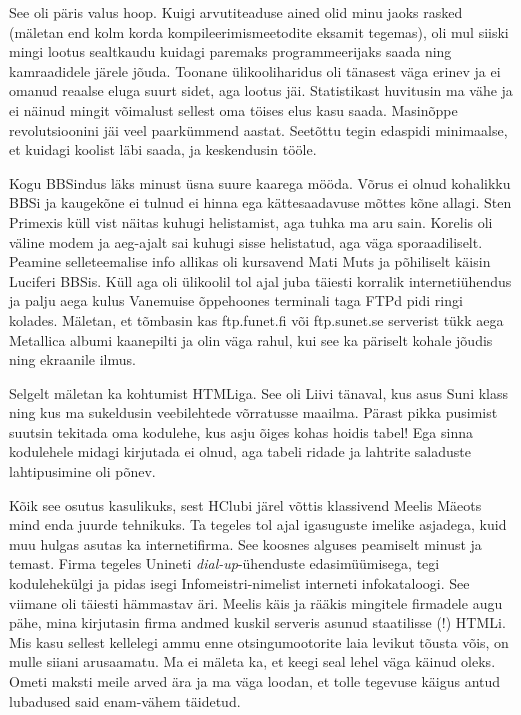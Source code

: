 See oli päris 
valus hoop. Kuigi arvutiteaduse ained olid minu jaoks rasked (mäletan end kolm 
korda kompileerimismeetodite eksamit tegemas), oli mul siiski mingi lootus 
sealtkaudu kuidagi paremaks programmeerijaks saada ning kamraadidele järele 
jõuda. Toonane ülikooliharidus oli tänasest väga erinev ja ei omanud reaalse eluga 
suurt sidet, aga lootus jäi. Statistikast huvitusin ma vähe ja 
ei näinud mingit võimalust sellest oma töises elus kasu saada. Masinõppe revolutsioonini 
jäi veel paarkümmend aastat. Seetõttu tegin 
edaspidi minimaalse, et kuidagi koolist läbi saada, ja keskendusin tööle. 

Kogu BBSindus läks minust üsna suure kaarega mööda. Võrus ei olnud kohalikku 
BBSi ja kaugekõne ei tulnud ei hinna ega kättesaadavuse mõttes kõne allagi. 
Sten Primexis küll vist näitas kuhugi 
helistamist, aga tuhka ma aru sain. Korelis oli väline modem ja aeg-ajalt 
sai kuhugi sisse helistatud, aga väga sporaadiliselt. Peamine 
selleteemalise info allikas oli kursavend Mati Muts ja 
põhiliselt käisin Luciferi BBSis. Küll aga oli 
ülikoolil tol ajal juba täiesti korralik internetiühendus ja palju aega kulus 
Vanemuise õppehoones terminali 
taga FTPd pidi ringi kolades. Mäletan, et tõmbasin kas ftp.funet.fi või 
ftp.sunet.se serverist tükk aega Metallica albumi kaanepilti ja olin väga 
rahul, kui see ka päriselt kohale jõudis ning ekraanile ilmus.

Selgelt mäletan ka kohtumist HTMLiga. See oli Liivi 
tänaval, kus asus Suni 
klass 
ning kus ma sukeldusin veebilehtede 
võrratusse maailma. Pärast pikka pusimist suutsin tekitada oma kodulehe, kus 
asju õiges kohas hoidis tabel! Ega sinna kodulehele midagi kirjutada ei olnud, 
aga tabeli ridade ja lahtrite saladuste lahtipusimine oli põnev.

Kõik see osutus kasulikuks, sest HClubi järel võttis 
klassivend Meelis Mäeots mind enda juurde tehnikuks. Ta tegeles tol ajal 
igasuguste imelike asjadega, kuid muu hulgas asutas ka internetifirma. See koosnes 
alguses peamiselt minust ja temast. Firma tegeles Unineti 
\emph{dial-up}-ühenduste edasimüümisega, tegi kodulehekülgi ja pidas isegi 
Infomeistri-nimelist interneti infokataloogi. See viimane oli täiesti hämmastav 
äri. Meelis käis ja rääkis mingitele firmadele augu pähe, mina kirjutasin firma 
andmed kuskil serveris asunud staatilisse (!) HTMLi. Mis kasu sellest kellelegi 
ammu enne otsingumootorite laia levikut tõusta võis, on mulle siiani 
arusaamatu. Ma ei mäleta ka, et keegi seal lehel väga käinud oleks. Ometi maksti 
meile arved ära ja ma väga loodan, et tolle tegevuse käigus antud lubadused said
enam-vähem täidetud. 

